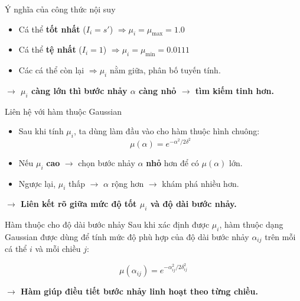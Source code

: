 \documentclass[10pt]{beamer}
\begin{document}
\begin{frame}{Ý nghĩa của công thức nội suy}
\begin{itemize}
    \item Cá thể \textbf{tốt nhất} ($I_i = s'$) $\Rightarrow \mu_i = \mu_{\max} = 1.0$
    \item Cá thể \textbf{tệ nhất} ($I_i = 1$) $\Rightarrow \mu_i = \mu_{\min} = 0.0111$
    \item Các cá thể còn lại $\Rightarrow \mu_i$ nằm giữa, phân bố tuyến tính.
\end{itemize}

\vspace{1em}
\textbf{$\to$ $\mu_i$ càng lớn thì bước nhảy $\alpha$ càng nhỏ $\to$ tìm kiếm tinh hơn.}
\end{frame}






\begin{frame}{Liên hệ với hàm thuộc Gaussian}
\begin{itemize}
    \item Sau khi tính $\mu_i$, ta dùng làm đầu vào cho hàm thuộc hình chuông:
    \[
    \mu(\alpha) = e^{-\alpha^2 / 2\delta^2}
    \]
    \item Nếu $\mu_i$ \textbf{cao} $\to$ chọn bước nhảy $\alpha$ \textbf{nhỏ} hơn để có $\mu(\alpha)$ lớn.
    \item Ngược lại, $\mu_i$ thấp $\to$ $\alpha$ rộng hơn $\to$ khám phá nhiều hơn.
\end{itemize}

\vspace{0.5em}
\textbf{$\to$ Liên kết rõ giữa mức độ tốt $\mu_i$ và độ dài bước nhảy.}
\end{frame}


\begin{frame}{Hàm thuộc cho độ dài bước nhảy}
Sau khi xác định được $\mu_i$, hàm thuộc dạng Gaussian được dùng để tính mức độ phù hợp của độ dài bước nhảy $\alpha_{ij}$ trên mỗi cá thể $i$ và mỗi chiều $j$:

\[
\mu(\alpha_{ij}) = e^{-\alpha_{ij}^2 / 2\delta_{ij}^2}
\]

\vspace{0.5em}
\textbf{ $\to$ Hàm giúp điều tiết bước nhảy linh hoạt theo từng chiều.}
\end{frame}
\end{document}
